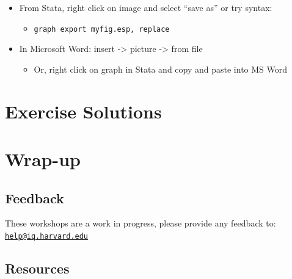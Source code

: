 \documentclass[]{book}
\providecommand{\tightlist}{%
  \setlength{\itemsep}{0pt}\setlength{\parskip}{0pt}}
\begin{document}
\begin{itemize}
\tightlist
\item
  From Stata, right click on image and select ``save as'' or try syntax:

  \begin{itemize}
  \tightlist
  \item
    \texttt{graph\ export\ myfig.esp,\ replace}
  \end{itemize}
\item
  In Microsoft Word: insert -\textgreater{} picture -\textgreater{} from
  file

  \begin{itemize}
  \tightlist
  \item
    Or, right click on graph in Stata and copy and paste into MS Word
  \end{itemize}
\end{itemize}

\section{Exercise Solutions}\label{exercise-solutions-6}

\section{Wrap-up}\label{wrap-up-9}

\subsection{Feedback}\label{feedback-9}

These workshops are a work in progress, please provide any feedback to:
\href{mailto:help@iq.harvard.edu}{\nolinkurl{help@iq.harvard.edu}}

\subsection{Resources}\label{resources-9}
\end{document}
